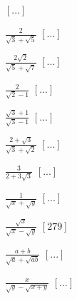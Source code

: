 \begin{esercizio}
\begin{htmulticols}{4}
\begin{enumeratea}
\hfill \(\left[...\right]\)
\item \(\frac 2{\sqrt 3+\sqrt 5}\)
\hfill \(\left[...\right]\)
\item \(\frac{2\sqrt 2}{\sqrt 5+\sqrt 7}\)
\hfill \(\left[...\right]\)
\item \(\frac 2{\sqrt 2-1}\)
\hfill \(\left[...\right]\)
\item \(\frac{\sqrt 3+1}{\sqrt 3-1}\)
\hfill \(\left[...\right]\)
\item \(\frac{2+\sqrt 3}{\sqrt 3+\sqrt 2}\)
\hfill \(\left[...\right]\)
\item \(\frac 3{2+3\sqrt 3}\)
\hfill \(\left[...\right]\)
\item \(\frac 1{\sqrt x+\sqrt y}\)
\hfill \(\left[...\right]\)
\item \(\frac{\sqrt x}{\sqrt x-\sqrt y}\)
\hfill \(\left[279\right]\)
\item \(\frac{a+b}{\sqrt a+\sqrt{ab}}\)
\hfill \(\left[...\right]\)
\item \(\frac x{\sqrt y-\sqrt{x+y}}\)
\hfill \(\left[...\right]\)
\end{enumeratea}
\end{htmulticols}
\end{esercizio}


